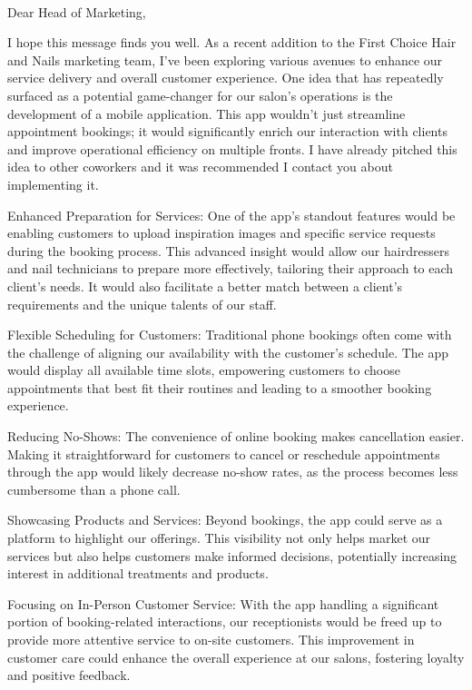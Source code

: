 \documentclass[12pt]{article}
\begin{document}
\\

Dear Head of Marketing,

I hope this message finds you well. As a recent addition to the First Choice Hair and Nails marketing team, I've been exploring various avenues to enhance our service delivery and overall customer experience. One idea that has repeatedly surfaced as a potential game-changer for our salon’s operations is the development of a mobile application. This app wouldn't just streamline appointment bookings; it would significantly enrich our interaction with clients and improve operational efficiency on multiple fronts. I have already pitched this idea to other coworkers and it was recommended I contact you about implementing it.

Enhanced Preparation for Services: One of the app's standout features would be enabling customers to upload inspiration images and specific service requests during the booking process. This advanced insight would allow our hairdressers and nail technicians to prepare more effectively, tailoring their approach to each client's needs. It would also facilitate a better match between a client's requirements and the unique talents of our staff.

Flexible Scheduling for Customers: Traditional phone bookings often come with the challenge of aligning our availability with the customer's schedule. The app would display all available time slots, empowering customers to choose appointments that best fit their routines and leading to a smoother booking experience.

Reducing No-Shows: The convenience of online booking makes cancellation easier. Making it straightforward for customers to cancel or reschedule appointments through the app would likely decrease no-show rates, as the process becomes less cumbersome than a phone call.

Showcasing Products and Services: Beyond bookings, the app could serve as a platform to highlight our offerings. This visibility not only helps market our services but also helps customers make informed decisions, potentially increasing interest in additional treatments and products.

Focusing on In-Person Customer Service: With the app handling a significant portion of booking-related interactions, our receptionists would be freed up to provide more attentive service to on-site customers. This improvement in customer care could enhance the overall experience at our salons, fostering loyalty and positive feedback.
\end{document}
